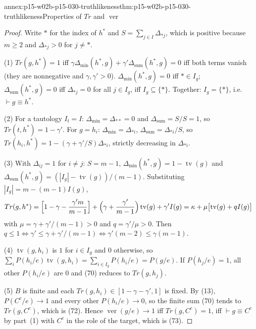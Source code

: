 \begin{annexitem}{annex:p15-w02b-p15-030-truthlikeness}{thm:p15-w02b-p15-030-truthlikeness}{Properties of \(Tr\) and \(\operatorname{ver}\)}
\begin{proof}
Write \(*\) for the index of \(h^*\) and \(S=\sum_{j\in I}\Delta_{*j}\), which is
positive because \(m\geq2\) and \(\Delta_{*j}>0\) for \(j\neq*\).

(1) \(Tr(g,h^*)=1\) iff \(\gamma\Delta_{\min}(h^*,g)+\gamma'\Delta_{\mathrm{sum}}(h^*,g)=0\)
iff both terms vanish (they are nonnegative and \(\gamma,\gamma'>0\)).
\(\Delta_{\min}(h^*,g)=0\) iff \(*\in I_g\); \(\Delta_{\mathrm{sum}}(h^*,g)=0\) iff
\(\Delta_{*j}=0\) for all \(j\in I_g\), iff \(I_g\subseteq\{*\}\). Together:
\(I_g=\{*\}\), i.e. \(\vdash g\equiv h^*\).

(2) For a tautology \(I_t=I\): \(\Delta_{\min}=\Delta_{**}=0\) and
\(\Delta_{\mathrm{sum}}=S/S=1\), so \(Tr(t,h^*)=1-\gamma'\). For \(g=h_i\):
\(\Delta_{\min}=\Delta_{*i}\), \(\Delta_{\mathrm{sum}}=\Delta_{*i}/S\), so
\(Tr(h_i,h^*)=1-(\gamma+\gamma'/S)\Delta_{*i}\), strictly decreasing in
\(\Delta_{*i}\).

(3) With \(\Delta_{ij}=1\) for \(i\neq j\): \(S=m-1\),
\(\Delta_{\min}(h^*,g)=1-\operatorname{tv}(g)\) and
\(\Delta_{\mathrm{sum}}(h^*,g)=(|I_g|-\operatorname{tv}(g))/(m-1)\). Substituting
\(|I_g|=m-(m-1)I(g)\),
\[
 Tr(g,h^*)=\Bigl[1-\gamma-\frac{\gamma'm}{m-1}\Bigr]
 +\Bigl(\gamma+\frac{\gamma'}{m-1}\Bigr)\operatorname{tv}(g)+\gamma'I(g)
 =\kappa+\mu\bigl[\operatorname{tv}(g)+qI(g)\bigr]
\]
with \(\mu=\gamma+\gamma'/(m-1)>0\) and \(q=\gamma'/\mu>0\). Then
\(q\leq1\iff\gamma'\leq\gamma+\gamma'/(m-1)\iff\gamma'(m-2)\leq\gamma(m-1)\).

(4) \(\operatorname{tv}(g,h_i)\) is \(1\) for \(i\in I_g\) and \(0\) otherwise, so
\(\sum_iP(h_i/e)\operatorname{tv}(g,h_i)=\sum_{i\in I_g}P(h_i/e)=P(g/e)\). If
\(P(h_j/e)=1\), all other \(P(h_i/e)\) are \(0\) and (70) reduces to
\(Tr(g,h_j)\).

(5) \(B\) is finite and each \(Tr(g,h_i)\in[1-\gamma-\gamma',1]\) is fixed. By
(13), \(P(C^c/e)\to1\) and every other \(P(h_i/e)\to0\), so the finite sum (70)
tends to \(Tr(g,C^c)\), which is (72). Hence \(\operatorname{ver}(g/e)\to1\) iff
\(Tr(g,C^c)=1\), iff \(\vdash g\equiv C^c\) by part~(1) with \(C^c\) in the role
of the target, which is (73).
\end{proof}
\end{annexitem}

